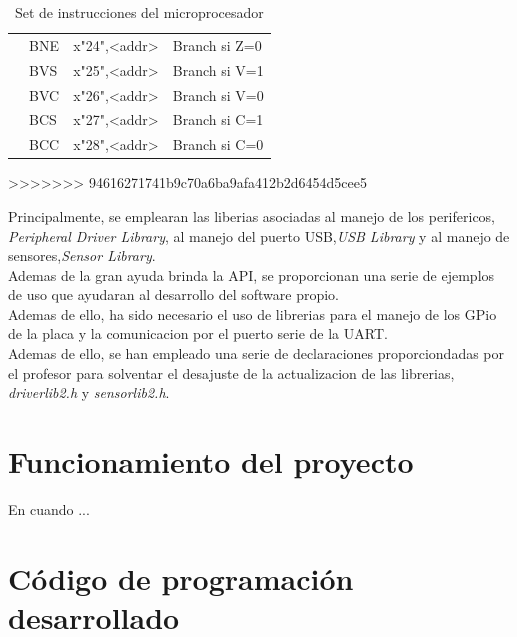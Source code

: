 \documentclass[a4paper,twoside]{article}
\begin{document}
\begin{table}[h!]
\begin{tabular}{|l|l|l|l|}
																	   & BNE  & x"24",<addr> & Branch si Z=0 \\ \cline{2-4}
																		 & BVS  & x"25",<addr> & Branch si V=1 \\ \cline{2-4}
																		 & BVC  & x"26",<addr> & Branch si V=0 \\ \cline{2-4}
																		 & BCS  & x"27",<addr> & Branch si C=1 \\ \cline{2-4}
																	   & BCC  & x"28",<addr> & Branch si C=0 \\ \cline{2-4}
																		 	\hline
    \end{tabular}    \caption{Set de instrucciones del microprocesador}
    \end{table}

>>>>>>> 94616271741b9c70a6ba9afa412b2d6454d5cee5

Principalmente, se emplearan las liberias asociadas al manejo de los perifericos, \textit{Peripheral Driver Library}, al manejo del puerto USB,\textit{USB Library} y al manejo de sensores,\textit{Sensor Library}. \\
Ademas de la gran ayuda brinda la API, se proporcionan una serie de ejemplos de uso que ayudaran al desarrollo del software propio. \\

Ademas de ello, ha sido necesario el uso de librerias para el manejo de los GPio de la placa y la comunicacion por el puerto serie de la UART. \\
Ademas de ello, se han empleado una serie de declaraciones proporciondadas por el profesor para solventar el desajuste de la actualizacion de las librerias, \textit{driverlib2.h} y \textit{sensorlib2.h}.

\newpage
\section{Funcionamiento del proyecto}
En cuando ...

\section{Código de programación desarrollado}

\newpage
\end{document}

